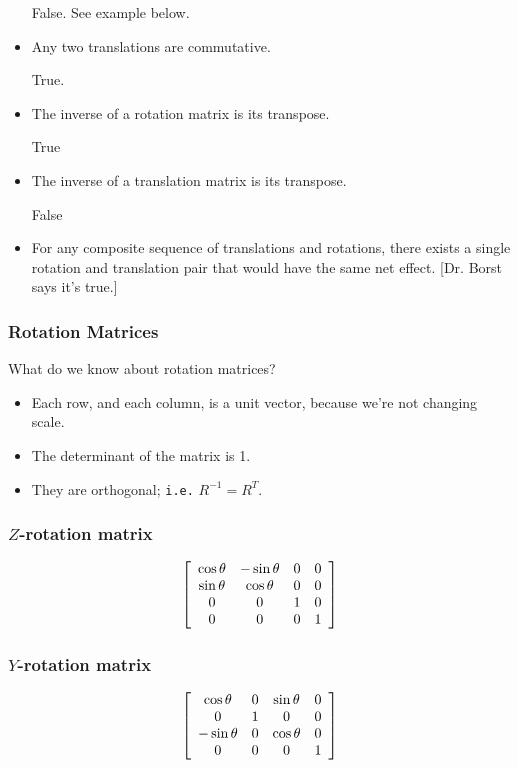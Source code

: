 \documentclass[11pt]{article}
\begin{document}
\begin{spacing}{1.2}
\begin{itemize}
	False.  See example below. 
	\item Any two translations are commutative.
	
	True.
	\item The inverse of a rotation matrix is its transpose.  
	
	True
	\item The inverse of a translation matrix is its transpose.  
	
	False
	\item For any composite sequence of translations and rotations, there exists a single rotation and translation pair that would have the same net effect.  [Dr. Borst says it's true.]
\end{itemize}

\subsubsection{Rotation Matrices}

What do we know about rotation matrices?

\begin{itemize}
	\item Each row, and each column, is a unit vector, because we're not changing scale.
	\item The determinant of the matrix is 1.
	\item They are orthogonal; {\tt i.e.} $R^{-1} = R^T$.
\end{itemize}

\subsubsection{$Z$-rotation matrix}

$$
\left[
\begin{array}{cccc}
	\cos \theta & - \sin \theta & 0 & 0 \cr
	\sin \theta & \cos \theta & 0 & 0 \cr
	0 & 0 & 1 & 0 \cr
	0 & 0 & 0 & 1 \cr
\end{array}
\right]
$$

\subsubsection{$Y$-rotation matrix}

$$
\left[
\begin{array}{cccc}
	\cos \theta & 0 & \sin \theta & 0 \cr
	0 & 1 & 0 & 0 \cr
	-\sin \theta & 0  & \cos \theta & 0 \cr
	0 & 0 & 0 & 1 \cr
\end{array}
\right]
$$


\end{spacing}
\end{document}
